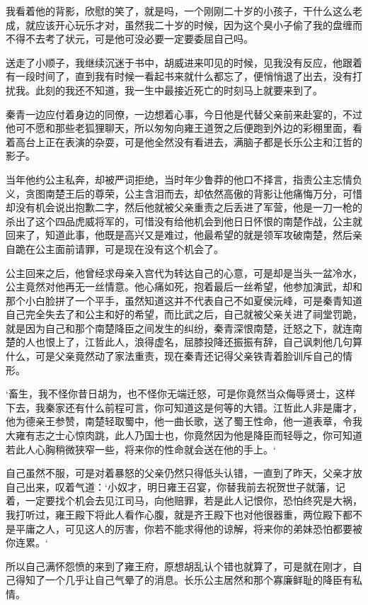 我看着他的背影，欣慰的笑了，就是吗，一个刚刚二十岁的小孩子，干什么这么老成，就应该开心玩乐才对，虽然我二十岁的时候，因为这个臭小子偷了我的盘缠而不得不去考了状元，可是他可没必要一定要委屈自己吗。

送走了小顺子，我继续沉迷于书中，胡威进来叩见的时候，见我没有反应，他跟着有一段时间了，直到我有时候一看起书来就什么都忘了，便悄悄退了出去，没有打扰我。此刻的我还不知道，我一生中最接近死亡的时刻马上就要来到了。

秦青一边应付着身边的同僚，一边想着心事，今日他是代替父亲前来赴宴的，不过他可不愿和那些老狐狸聊天，所以匆匆向雍王道贺之后便跑到外边的彩棚里面，看着高台上正在表演的杂耍，可是他全然没有看进去，满脑子都是长乐公主和江哲的影子。

当年他约公主私奔，却被严词拒绝，当时年少鲁莽的他口不择言，指责公主忘情负义，贪图南楚王后的尊荣，公主含泪而去，却依然高傲的背影让他痛悔万分，可惜却没有机会说出抱歉二字，然后他就被父亲重责之后丢进了军营，他是一刀一枪的杀出了这个四品虎威将军的，可惜没有给他机会到他日日怀恨的南楚作战，公主就回来了，知道此事，他既是高兴又是难过，他最希望的就是领军攻破南楚，然后亲自跪在公主面前请罪，可是现在没有这个机会了。

公主回来之后，他曾经求母亲入宫代为转达自己的心意，可是却是当头一盆冷水，公主竟然对他再无一丝情意。他心痛如死，抱着最后一丝希望，他参加演武，却和那个小白脸拼了一个平手，虽然知道这并不代表自己不如夏侯沅峰，可是秦青知道自己完全失去了和公主和好的希望，而比武之后，自己就被父亲关进了祠堂罚跪，就是因为自己和那个南楚降臣之间发生的纠纷，秦青深恨南楚，迁怒之下，就连南楚的人也恨上了，江哲此人，浪得虚名，屈膝投降还振振有辞，自己讽刺他几句算什么，可是父亲竟然动了家法重责，现在秦青还记得父亲铁青着脸训斥自己的情形。

‘畜生，我不怪你昔日胡为，也不怪你无端迁怒，可是你竟然当众侮辱贤士，这样下去，我秦家还有什么前程可言，你可知道这是何等的大错。江哲此人非是庸才，他为德亲王参赞，南楚轻取蜀中，他一曲长歌，送了蜀王性命，他一道表章，令我大雍有志之士心惊肉跳，此人乃国士也，你竟然因为他是降臣而轻辱之，你可知道若此人心胸稍微狭窄一些，将来你的性命就会送在他的手上。‘

自己虽然不服，可是对着暴怒的父亲仍然只得低头认错，一直到了昨天，父亲才放自己出来，叹着气道：‘小奴才，明日雍王召宴，你替我前去祝贺世子就藩，记着，一定要找个机会去见江司马，向他赔罪，若是此人记恨你，恐怕终究是大祸，我打听过，雍王殿下将此人看作心腹，就是齐王殿下也对他很器重，两位殿下都不是平庸之人，可见这人的厉害，你若不能求得他的谅解，将来你的弟妹恐怕都要被你连累。‘

所以自己满怀怨愤的来到了雍王府，原想胡乱认个错也就算了，可是就在刚才，自己得知了一个几乎让自己气晕了的消息。长乐公主居然和那个寡廉鲜耻的降臣有私情。

